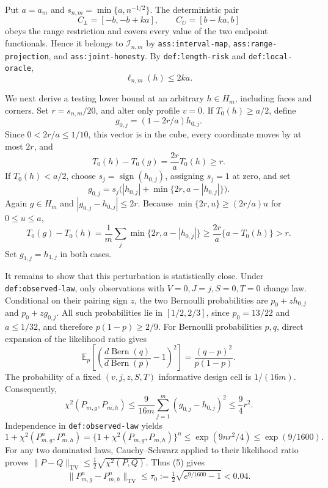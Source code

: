 Put \(a=a_m\) and \(s_{n,m}=\min\{a,n^{-1/2}\}\).  The deterministic pair
\[
 C_L=[-b,-b+ka],\qquad C_U=[b-ka,b]
\]
obeys the range restriction and covers every value of the two endpoint
functionals.  Hence it belongs to \(\mathcal I_{n,m}\) by
\texttt{ass:interval-map}, \texttt{ass:range-projection}, and
\texttt{ass:joint-honesty}.  By \texttt{def:length-risk} and
\texttt{def:local-oracle},
\[
 \ell_{n,m}(h)\le 2ka.                                                    \tag{1}
\]

We next derive a testing lower bound at an arbitrary \(h\in H_m\), including
faces and corners.  Set \(r=s_{n,m}/20\), and alter only profile \(v=0\).
If \(T_0(h)\ge a/2\), define
\[
 g_{0,j}=(1-2r/a)h_{0,j}.
\]
Since \(0<2r/a\le 1/10\), this vector is in the cube, every coordinate moves
by at most \(2r\), and
\[
 T_0(h)-T_0(g)=\frac{2r}{a}T_0(h)\ge r.                                  \tag{2}
\]
If \(T_0(h)<a/2\), choose \(s_j=\operatorname{sign}(h_{0,j})\), assigning
\(s_j=1\) at zero, and set
\[
 g_{0,j}=s_j\bigl(|h_{0,j}|+\min\{2r,a-|h_{0,j}|\}\bigr).
\]
Again \(g\in H_m\) and \(|g_{0,j}-h_{0,j}|\le2r\).  Because
\(\min\{2r,u\}\ge(2r/a)u\) for \(0\le u\le a\),
\[
 T_0(g)-T_0(h)
 =\frac1m\sum_j\min\{2r,a-|h_{0,j}|\}
 \ge\frac{2r}{a}\{a-T_0(h)\}>r.                                        \tag{3}
\]
Set \(g_{1,j}=h_{1,j}\) in both cases.

It remains to show that this perturbation is statistically close.  Under
\texttt{def:observed-law}, only observations with
\(V=0,J=j,S=0,T=0\) change law.  Conditional on their pairing sign \(z\),
the two Bernoulli probabilities are \(p_0+zh_{0,j}\) and \(p_0+zg_{0,j}\).
All such probabilities lie in \([1/2,2/3]\), since
\(p_0=13/22\) and \(a\le1/32\), and therefore \(p(1-p)\ge2/9\).
For Bernoulli probabilities \(p,q\), direct expansion of the likelihood
ratio gives
\[
 \mathbb E_p\left[\left(\frac{d\operatorname{Bern}(q)}
 {d\operatorname{Bern}(p)}-1\right)^2\right]
 =\frac{(q-p)^2}{p(1-p)}.
\]
The probability of a fixed \((v,j,z,S,T)\) informative design cell is
\(1/(16m)\).  Consequently,
\[
 \chi^2(P_{m,g},P_{m,h})
 \le \frac{9}{16m}\sum_{j=1}^m(g_{0,j}-h_{0,j})^2
 \le\frac94r^2.                                                         \tag{4}
\]
Independence in \texttt{def:observed-law} yields
\[
 1+\chi^2(P_{m,g}^n,P_{m,h}^n)
 =\{1+\chi^2(P_{m,g},P_{m,h})\}^n
 \le \exp(9nr^2/4)\le \exp(9/1600).                                    \tag{5}
\]
For any two dominated laws, Cauchy--Schwarz applied to their likelihood
ratio proves
\(\|P-Q\|_{\mathrm{TV}}\le\frac12\sqrt{\chi^2(P,Q)}\).  Thus (5) gives
\[
 \|P_{m,g}^n-P_{m,h}^n\|_{\mathrm{TV}}
 \le\tau_0:=\tfrac12\sqrt{e^{9/1600}-1}<0.04.                           \tag{6}
\]

